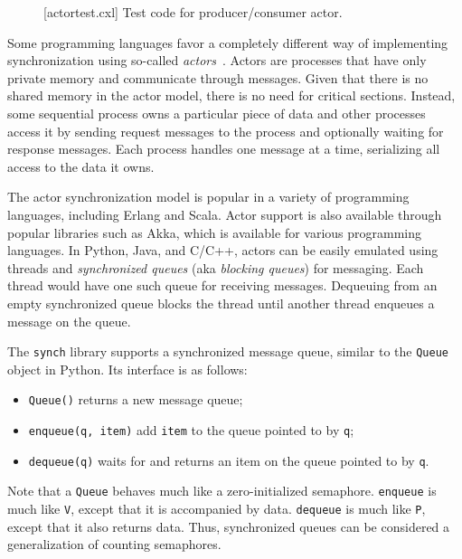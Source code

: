 \documentclass{report}
\newenvironment{code}{
\tcolorbox
}{
\endtcolorbox
}
\begin{document}
\begin{figure}
\begin{code}
\end{code}
\caption{[actortest.cxl] Test code for producer/consumer actor.}
\label{fig:actortest}
\end{figure}

Some programming languages favor a completely different way of implementing
synchronization using so-called \emph{actors}~\cite{HBS73}.  Actors are
processes that have only private memory and communicate through messages.
Given that there is no shared memory in the actor model, there is no need
for critical sections.  Instead, some sequential process owns a particular
piece of data and other processes access it by sending request messages
to the process and optionally waiting for response messages.  Each process
handles one message at a time, serializing all access to the data it owns.

The actor synchronization model is popular in a variety of programming
languages, including Erlang and Scala.  Actor support is also available
through popular libraries such as Akka, which is available for various
programming languages.  In Python, Java, and C/C++,
actors can be easily emulated using threads and \emph{synchronized queues}
(aka \emph{blocking queues})
for messaging.
Each thread would have one such queue for receiving messages.
Dequeuing from an empty synchronized queue blocks the thread until
another thread enqueues a message on the queue.

The \texttt{synch} library supports a synchronized message queue,
similar to the \texttt{Queue} object in Python.
Its interface is as follows:
\begin{itemize}
\item \texttt{Queue()} returns a new message queue;
\item \texttt{enqueue(q, item)} add \texttt{item} to the queue pointed to by \texttt{q};
\item \texttt{dequeue(q)} waits for and returns an item on the queue pointed to by \texttt{q}.
\end{itemize}

Note that a \texttt{Queue} behaves much like a zero-initialized semaphore.
\texttt{enqueue} is much like \texttt{V}, except that it is accompanied by data.
\texttt{dequeue} is much like \texttt{P}, except that it also returns data.
Thus, synchronized queues can be considered a generalization of counting semaphores.
\end{document}
